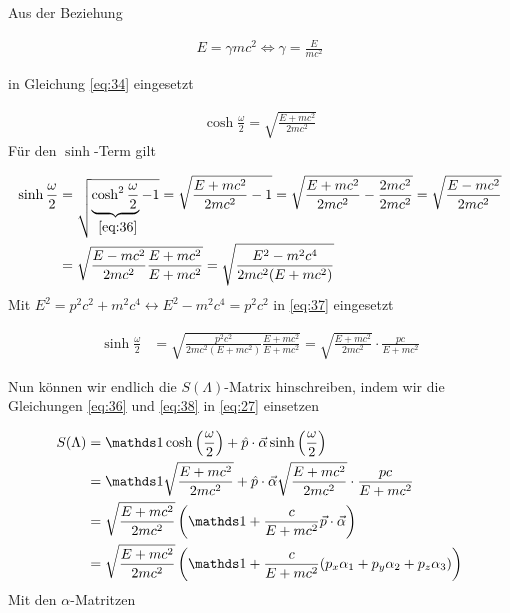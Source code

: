 Aus der Beziehung

\begin{align}
  \label{eq:35}
  E=\gamma mc^2 \Leftrightarrow \gamma = \frac{E}{mc^2}
\end{align}

in Gleichung \eqref{eq:34} eingesetzt

\begin{align}
  \label{eq:36}
   \cosh\frac{\omega}{2} = \sqrt{\frac{E + mc^2}{2mc^2}} 
\end{align}
Für den \(\sinh\)-Term gilt

\begin{align}
  \label{eq:37}
  \sinh\frac{\omega}{2} &=  \sqrt{\underbr{ \cosh^2\frac{\omega}{2}}_{~\eqref{eq:36}} - 1} =  \sqrt{\frac{E + mc^2}{2mc^2}  -1} =   \sqrt{\frac{E + mc^2}{2mc^2}  -\frac{2mc^2}{2mc^2}} =  \sqrt{\frac{E - mc^2}{2mc^2} } \notag \\
&=  \sqrt{\frac{E - mc^2}{2mc^2} \frac{E+mc^2}{E+mc^2}} =  \sqrt{\frac{E^2 - m^2c^4}{2mc^2(E+mc^2)} }
\end{align}
Mit \(E^2=p^2c^2+m^2c^4 \leftrightarrow E^2-m^2c^4 = p^2c^2\) in \eqref{eq:37} eingesetzt

\begin{align}
  \label{eq:38}
   \sinh\frac{\omega}{2} &=  \sqrt{\frac{p^2c^2}{2mc^2(E+mc^2)} \frac{E+mc^2}{E+mc^2} } = \sqrt{\frac{E+mc^2}{2mc^2}}\cdot \frac{pc}{E+mc^2}
\end{align}

Nun können wir endlich die \(S(\Lambda)\)-Matrix hinschreiben, indem wir die Gleichungen \eqref{eq:36} und \eqref{eq:38} in \eqref{eq:27} einsetzen

\begin{align}
  \label{eq:39}
   S(\Lambda) &= \mathds 1 \cosh\left(\frac{\omega}{2}\right) + \hat p\cdot\vec \alpha \sinh\left(\frac{\omega}{2} \right) \notag \\
&= \mathds 1 \sqrt{\frac{E + mc^2}{2mc^2}} +  \hat p\cdot\vec \alpha \sqrt{\frac{E+mc^2}{2mc^2}}\cdot \frac{pc}{E+mc^2} \notag \\
&=  \sqrt{\frac{E + mc^2}{2mc^2}}\left(\mathds 1 +  \frac{c}{E+mc^2}\vec p\cdot\vec\alpha\right)  \notag \\
&=  \sqrt{\frac{E + mc^2}{2mc^2}}\left(\mathds 1 +  \frac{c}{E+mc^2}( p_x\alpha_1+p_y\alpha_2+p_z\alpha_3) \right)  \notag \\
\end{align}
Mit den \(\alpha\)-Matritzen

